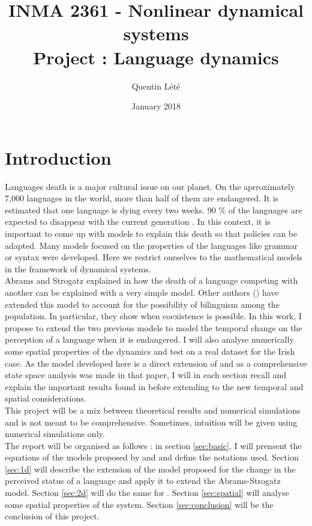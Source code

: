 \documentclass{article}
\title{INMA 2361 - Nonlinear dynamical systems \\
        Project : Language dynamics}
\author{Quentin Lété}
\date{January 2018}
\begin{document}
\maketitle

\section{Introduction}
Languages death is a major cultural issue on our planet.
On the aprroximately 7,000 languages in the world, more than half of them are endangered.
It is estimated that one language is dying every two weeks.
90 \% of the languages are expected to disappear with the current generation \cite{death}.
In this context, it is important to come up with models to explain this death so that policies can be adapted.
Many models focused on the properties of the languages like grammar or syntax were developed.
Here we restrict ourselves to the mathematical models in the framework of dynamical systems. \\
Abrams and Strogatz explained in \cite{death} how the death of a language competing with another can be explained with a very simple model.
Other authors (\cite{bilingual}) have extended this model to account for the possibility of bilinguism among the population. In particular, they show when coexistence is possible.
In this work, I propose to extend the two previous models to model the temporal change on the perception of a language when it is endangered.
I will also analyse numerically some spatial properties of the dynamics and test on a real dataset for the Irish case.
As the model developed here is a direct extension of \cite{bilingual} and as a comprehensive state space analysis was made in that paper,
I will in each section recall and explain the important results found in \cite{bilingual} before extending to the new temporal and spatial considerations. \\
This project will be a mix between theoretical results and numerical simulations and is not meant to be comprehensive. Sometimes, intuition will be given using numerical simulations only. \\
The report will be organised as follows : in section \ref{sec:basic},
I will prensent the equations of the models proposed by \cite{death} and \cite{bilingual} and define the notations used.
Section \ref{sec:1d} will describe the extension of the model proposed for the change in the perceived status of a language and apply it to extend the Abrams-Strogatz model.
Section \ref{sec:2d} will do the same for \cite{bilingual}.
Section \ref{sec:spatial} will analyse some spatial properties of the system.
Section \ref{sec:conclusion} will be the conclusion of this project.
\end{document}
